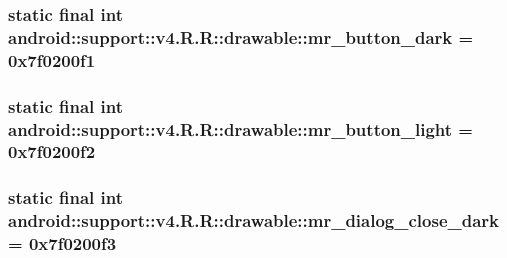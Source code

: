 \hypertarget{classandroid_1_1support_1_1v4_1_1_r_1_1drawable_7949ea929a876cc58cdf1203b6999dee}{
\subsubsection[{mr\_\-button\_\-dark}]{\setlength{\rightskip}{0pt plus 5cm}static final int android::support::v4.R.R::drawable::mr\_\-button\_\-dark = 0x7f0200f1}}
\label{classandroid_1_1support_1_1v4_1_1_r_1_1drawable_7949ea929a876cc58cdf1203b6999dee}


\hypertarget{classandroid_1_1support_1_1v4_1_1_r_1_1drawable_aca725a5536e5a673f516912ec0d2cd0}{
\subsubsection[{mr\_\-button\_\-light}]{\setlength{\rightskip}{0pt plus 5cm}static final int android::support::v4.R.R::drawable::mr\_\-button\_\-light = 0x7f0200f2}}
\label{classandroid_1_1support_1_1v4_1_1_r_1_1drawable_aca725a5536e5a673f516912ec0d2cd0}


\hypertarget{classandroid_1_1support_1_1v4_1_1_r_1_1drawable_3dae3ff2638cb3aea347d337a06402fb}{
\subsubsection[{mr\_\-dialog\_\-close\_\-dark}]{\setlength{\rightskip}{0pt plus 5cm}static final int android::support::v4.R.R::drawable::mr\_\-dialog\_\-close\_\-dark = 0x7f0200f3}}
\label{classandroid_1_1support_1_1v4_1_1_r_1_1drawable_3dae3ff2638cb3aea347d337a06402fb}


